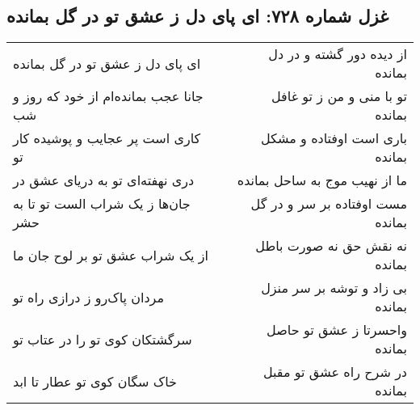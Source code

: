 \begin{center}
\section*{غزل شماره ۷۲۸: ای پای دل ز عشق تو در گل بمانده}
\label{sec:728}
\begin{longtable}{l p{0.5cm} r}
ای پای دل ز عشق تو در گل بمانده
&&
از دیده دور گشته و در دل بمانده
\\
جانا عجب بمانده‌ام از خود که روز و شب
&&
تو با منی و من ز تو غافل بمانده
\\
کاری است پر عجایب و پوشیده کار تو
&&
باری است اوفتاده و مشکل بمانده
\\
دری نهفته‌ای تو به دریای عشق در
&&
ما از نهیب موج به ساحل بمانده
\\
جان‌ها ز یک شراب الست تو تا به حشر
&&
مست اوفتاده بر سر و در گل بمانده
\\
از یک شراب عشق تو بر لوح جان ما
&&
نه نقش حق نه صورت باطل بمانده
\\
مردان پاک‌رو ز درازی راه تو
&&
بی زاد و توشه بر سر منزل بمانده
\\
سرگشتکان کوی تو را در عتاب تو
&&
واحسرتا ز عشق تو حاصل بمانده
\\
خاک سگان کوی تو عطار تا ابد
&&
در شرح راه عشق تو مقبل بمانده
\\
\end{longtable}
\end{center}
